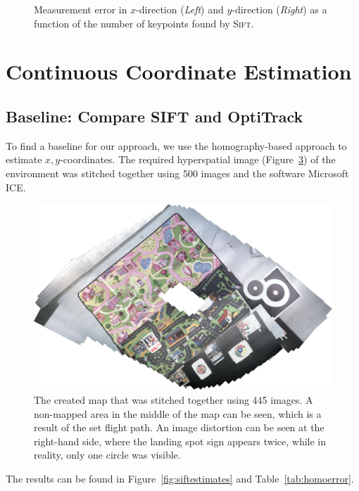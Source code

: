 \documentclass[11pt]{report}
\begin{document}
\begin{figure}
\begin{subfigure}[b]{0.5\textwidth}
  \label{fig:cosinesd}
  \end{subfigure}
  \caption{Measurement error in $x$-direction (\emph{Left}) and
    $y$-direction (\emph{Right}) as a function of the number of
    keypoints found by \textsc{Sift}.}
\label{fig:cosine}
\end{figure}

\section{Continuous Coordinate Estimation}

\subsection{Baseline: Compare SIFT and OptiTrack}
\label{sec:siftvsoptitrack}

To find a baseline for our approach, we use the homography-based
approach to estimate $x,y$-coordinates. The required hyperspatial
image (Figure~\ref{fig:mapexp}) of the environment was stitched
together using 500 images and the software Microsoft ICE.

\begin{figure}[h!]
\begin{center}
\includegraphics[width=0.7\columnwidth]{map_rotated}
\caption{{\label{fig:mapexp} The created map that was stitched
    together using 445 images. A non-mapped area in the middle of the
    map can be seen, which is a result of the set flight path. An
    image distortion can be seen at the right-hand side, where the
    landing spot sign appears twice, while in reality, only one circle
    was visible.%
  }}
\end{center}
\end{figure}

The results can be found in Figure~\ref{fig:siftestimates} and Table~\ref{tab:homoerror}.
\end{document}
